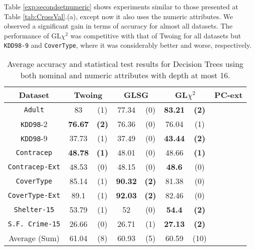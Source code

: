 Table \ref{exp:secondsetnumeric}
shows experiments  similar to those presented at Table \ref{tab:CrossVal}.(a), except now it also uses the numeric attributes.
We observed a significant gain in terms of accuracy for almost all datasets. 
The performance of GL$\chi^2$ was competitive with that of Twoing for all datasets but {\tt KDD98-9} and {\tt CoverType}, where it was
considerably better and worse, respectively.


\begin{table}
\small
\caption{Average accuracy and statistical test results for  Decision Trees using both nominal and numeric attributes with depth at most 16.}
\centering
\begin{tabular}{c|cc|cc|cc|cc} 
Dataset              &        \multicolumn{2}{c|}{Twoing} &   \multicolumn{2}{c|}{GLSG} &   \multicolumn{2}{c|}{GL$\chi^2$} & \multicolumn{2}{c}{PC-ext}  \\  \hline   
{\tt Adult}          &  83            &  (1)              &  77.34      &  (0)          &  {\bf 83.21} &  {\bf (2)}         &             &               \\
{\tt KDD98}-2        &  {\bf 76.67}   &  {\bf (2)}        &  76.36      &  (0)          &  76.04       &  (1)               &             &               \\
{\tt KDD98}-9        &  37.73         &  (1)              &  37.49      &  (0)          &  {\bf 43.44} &  {\bf (2)}         &             &               \\
{\tt Contracep}      &  {\bf 48.78}   &  {\bf (1)}        &  48.01      &  (0)          &  48.66       &  {\bf (1)}         &             &               \\
{\tt Contracep-Ext}  &  48.53         &  (0)              &  48.15      &  (0)          &  {\bf 48.6}  &  (0)               &             &               \\
{\tt CoverType}      &  85.14         &  (1)              &  {\bf 90.32}&  {\bf (2)}    &  81.38       &  (0)               &             &               \\
{\tt CoverType-Ext}  &  89.1          &  (1)              &  {\bf 92.03}&  {\bf (2)}    &  82.46       &  (0)               &             &               \\
{\tt Shelter-15}     &  53.79         &  (1)              &  52         &  (0)          &  {\bf 54.4}  &  {\bf (2)}         &             &               \\   
{\tt S.F. Crime-15}  &  26.66         &  (0)              &  26.71      &  (1)          &  {\bf 27.13} &  {\bf (2)}         &             &               \\
\hline
Average (Sum)        &   61.04        &  (8)              & 60.93       & (5)           &   60.59      & (10)               &             &


\end{tabular}
\end{table}
